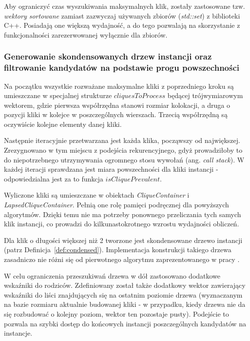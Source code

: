 \documentclass[12pt]{article}
\begin{document}
Aby ograniczyć czas wyszukiwania maksymalnych klik, zostały zastosowane tzw. \textit{wektory sortowane} zamiast zazwyczaj używanych zbiorów (\textit{std::set}) z biblioteki C++. Posiadają one większą wydajność, a do tego pozwalają na skorzystanie z funkcjonalności zarezerwowanej wyłącznie dla zbiorów.

\subsubsection{Generowanie skondensowanych drzew instancji oraz filtrowanie kandydatów na podstawie progu powszechności}

Na początku wszystkie rozważane maksymalne kliki z poprzedniego kroku są umieszczane w specjalnej strukturze $ cliquesToProcess $ będącej trójwymiarowym wektorem, gdzie pierwsza współrzędna stanowi rozmiar kolokacji, a druga o pozycji kliki w kolejce w poszczególnych wierszach. Trzecią współrzędną są oczywiście kolejne elementy danej kliki.

Następnie iteracyjnie przetwarzana jest każda klika, począwszy od największej. Zrezygnowano w tym miejscu z podejścia rekurencyjnego, gdyż prowadziłoby to do niepotrzebnego utrzymywania ogromnego stosu wywołań (ang. \textit{call stack}). W każdej iteracji sprawdzana jest miara powszechności dla kliki instancji - odpowiedzialna jest za to funkcja $ isCliquePrevalent $. 

Wyliczone kliki są umieszczane w obiektach \textit{CliqueContainer} i \textit{LapsedCliqueContainer}. Pełnią one rolę pamięci podręcznej dla powyższych algorytmów. Dzięki temu nie ma potrzeby ponownego przeliczania tych samych klik instancji, co prowadzi do kilkunastokrotnego wzrostu wydajności obliczeń.

Dla klik o długości większej niż 2 tworzone jest skondensowane drzewo instancji (patrz Definicja~\ref{def:condensed}). Implementacja konstrukcji takiego drzewa zasadniczo nie różni się od pierwotnego algorytmu zaprezentowanego w pracy \cite{chinczyki}.

W celu ograniczenia przeszukiwań drzewa w dół zastosowano dodatkowe wskaźniki do rodziców. Zdefiniowany został także dodatkowy wektor zawierający wskaźniki do liści znajdujących się na ostatnim poziomie drzewa (wyznaczanym na bazie rozmiaru aktualnie budowanej kliki - w przypadku, kiedy drzewa nie da się rozbudować o kolejny poziom, wektor ten pozostaje pusty). Podejście to pozwala na szybki dostęp do końcowych instancji poszczególnych kandydatów na instancje.
\end{document}
